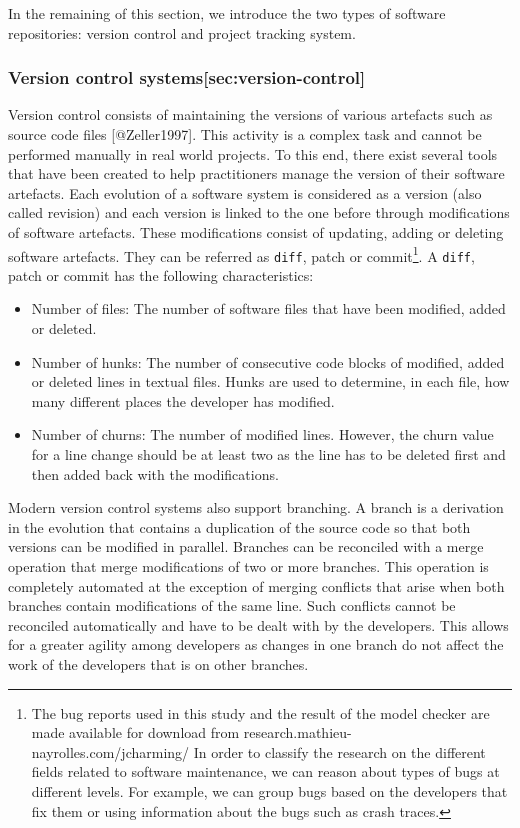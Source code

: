 In the remaining of this section, we introduce the two types of software
repositories: version control and project tracking system.

\subsubsection{Version control
systems{[}sec:version-control{]}}\label{version-control-systemssecversion-control}

Version control consists of maintaining the versions of various
artefacts such as source code files {[}@Zeller1997{]}. This activity is
a complex task and cannot be performed manually in real world projects.
To this end, there exist several tools that have been created to help
practitioners manage the version of their software artefacts. Each
evolution of a software system is considered as a version (also called
revision) and each version is linked to the one before through
modifications of software artefacts. These modifications consist of
updating, adding or deleting software artefacts. They can be referred as
\texttt{diff}, {patch} or {commit}\footnote{The bug reports used in this
  study and the result of the model checker are made available for
  download from research.mathieu- nayrolles.com/jcharming/ In order to
  classify the research on the different fields related to software
  maintenance, we can reason about types of bugs at different levels.
  For example, we can group bugs based on the developers that fix them
  or using information about the bugs such as crash traces.}. A
\texttt{diff}, {patch} or {commit} has the following characteristics:

\begin{itemize}
\item
  Number of files: The number of software files that have been modified,
  added or deleted.
\item
  Number of hunks: The number of consecutive code blocks of modified,
  added or deleted lines in textual files. Hunks are used to determine,
  in each file, how many different places the developer has modified.
\item
  Number of churns: The number of modified lines. However, the churn
  value for a line change should be at least two as the line has to be
  deleted first and then added back with the modifications.
\end{itemize}

Modern version control systems also support branching. A branch is a
derivation in the evolution that contains a duplication of the source
code so that both versions can be modified in parallel. Branches can be
reconciled with a merge operation that merge modifications of two or
more branches. This operation is completely automated at the exception
of merging conflicts that arise when both branches contain modifications
of the same line. Such conflicts cannot be reconciled automatically and
have to be dealt with by the developers. This allows for a greater
agility among developers as changes in one branch do not affect the work
of the developers that is on other branches.

